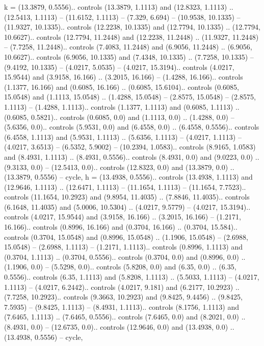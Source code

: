 k = {(13.3879, 0.5556).. controls (13.3879, 1.1113) and (12.8323, 1.1113) .. (12.5413, 1.1113) -- (11.6152, 1.1113) -- (7.329, 6.694) -- (10.9538, 10.1335) -- (11.9327, 10.1335).. controls (12.2238, 10.1335) and (12.7794, 10.1335) .. (12.7794, 10.6627).. controls (12.7794, 11.2448) and (12.2238, 11.2448) .. (11.9327, 11.2448) -- (7.7258, 11.2448).. controls (7.4083, 11.2448) and (6.9056, 11.2448) .. (6.9056, 10.6627).. controls (6.9056, 10.1335) and (7.4348, 10.1335) .. (7.7258, 10.1335) -- (9.4192, 10.1335) -- (4.0217, 5.0535) -- (4.0217, 15.3194).. controls (4.0217, 15.9544) and (3.9158, 16.166) .. (3.2015, 16.166) -- (1.4288, 16.166).. controls (1.1377, 16.166) and (0.6085, 16.166) .. (0.6085, 15.6104).. controls (0.6085, 15.0548) and (1.1113, 15.0548) .. (1.4288, 15.0548) -- (2.8575, 15.0548) -- (2.8575, 1.1113) -- (1.4288, 1.1113).. controls (1.1377, 1.1113) and (0.6085, 1.1113) .. (0.6085, 0.5821).. controls (0.6085, 0.0) and (1.1113, 0.0) .. (1.4288, 0.0) -- (5.6356, 0.0).. controls (5.9531, 0.0) and (6.4558, 0.0) .. (6.4558, 0.5556).. controls (6.4558, 1.1113) and (5.9531, 1.1113) .. (5.6356, 1.1113) -- (4.0217, 1.1113) -- (4.0217, 3.6513) -- (6.5352, 5.9002) -- (10.2394, 1.0583).. controls (8.9165, 1.0583) and (8.4931, 1.1113) .. (8.4931, 0.5556).. controls (8.4931, 0.0) and (9.0223, 0.0) .. (9.3133, 0.0) -- (12.5413, 0.0).. controls (12.8323, 0.0) and (13.3879, 0.0) .. (13.3879, 0.5556) -- cycle},
h = {(13.4938, 0.5556).. controls (13.4938, 1.1113) and (12.9646, 1.1113) .. (12.6471, 1.1113) -- (11.1654, 1.1113) -- (11.1654, 7.7523).. controls (11.1654, 10.2923) and (9.8954, 11.4035) .. (7.8846, 11.4035).. controls (6.1648, 11.4035) and (5.0006, 10.5304) .. (4.0217, 9.5779) -- (4.0217, 15.3194).. controls (4.0217, 15.9544) and (3.9158, 16.166) .. (3.2015, 16.166) -- (1.2171, 16.166).. controls (0.8996, 16.166) and (0.3704, 16.166) .. (0.3704, 15.584).. controls (0.3704, 15.0548) and (0.8996, 15.0548) .. (1.1906, 15.0548) -- (2.6988, 15.0548) -- (2.6988, 1.1113) -- (1.2171, 1.1113).. controls (0.8996, 1.1113) and (0.3704, 1.1113) .. (0.3704, 0.5556).. controls (0.3704, 0.0) and (0.8996, 0.0) .. (1.1906, 0.0) -- (5.5298, 0.0).. controls (5.8208, 0.0) and (6.35, 0.0) .. (6.35, 0.5556).. controls (6.35, 1.1113) and (5.8208, 1.1113) .. (5.5033, 1.1113) -- (4.0217, 1.1113) -- (4.0217, 6.2442).. controls (4.0217, 9.181) and (6.2177, 10.2923) .. (7.7258, 10.2923).. controls (9.3663, 10.2923) and (9.8425, 9.4456) .. (9.8425, 7.5935) -- (9.8425, 1.1113) -- (8.4931, 1.1113).. controls (8.1756, 1.1113) and (7.6465, 1.1113) .. (7.6465, 0.5556).. controls (7.6465, 0.0) and (8.2021, 0.0) .. (8.4931, 0.0) -- (12.6735, 0.0).. controls (12.9646, 0.0) and (13.4938, 0.0) .. (13.4938, 0.5556) -- cycle},
